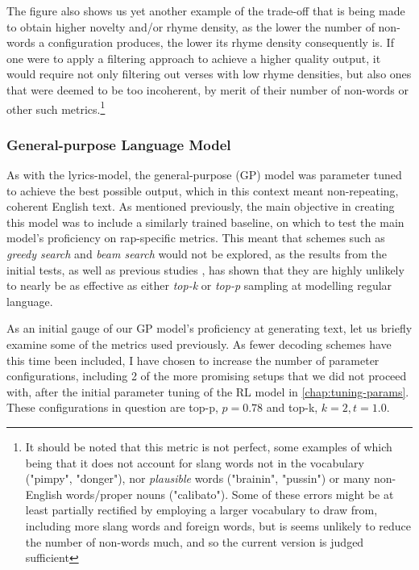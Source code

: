 The figure also shows us yet another example of the trade-off that is being made to obtain higher novelty and/or rhyme density, as the lower the number of non-words a configuration produces, the lower its rhyme density consequently is. If one were to apply a filtering approach to achieve a higher quality output, it would require not only filtering out verses with low rhyme densities, but also ones that were deemed to be too incoherent, by merit of their number of non-words or other such metrics.\footnote{It should be noted that this metric is not perfect, some examples of which being that it does not account for slang words not in the vocabulary ("pimpy", "donger"), nor \textit{plausible} words ("brainin", "pussin") or many non-English words/proper nouns ("calibato"). Some of these errors might be at least partially rectified by employing a larger vocabulary to draw from, including more slang words and foreign words, but is seems unlikely to reduce the number of non-words much, and so the current version is judged sufficient}

\subsubsection{General-purpose Language Model}
\label{sec:general-purpose-lm-results}

As with the lyrics-model, the general-purpose (GP) model was parameter tuned to achieve the best possible output, which in this context meant non-repeating, coherent English text. As mentioned previously, the main objective in creating this model was to include a similarly trained baseline, on which to test the main model's proficiency on rap-specific metrics. This meant that schemes such as \textit{greedy search} and \textit{beam search} would not be explored, as the results from the initial tests, as well as previous studies \cite{HoltzmanAri2019TCCo}, has shown that they are highly unlikely to nearly be as effective as either \textit{top-k} or \textit{top-p} sampling at modelling regular language.

As an initial gauge of our GP model's proficiency at generating text, let us briefly examine some of the metrics used previously. As fewer decoding schemes have this time been included, I have chosen to increase the number of parameter configurations, including 2 of the more promising setups that we did not proceed with, after the initial parameter tuning of the RL model in \cref{chap:tuning-params}. These configurations in question are top-p, $p=0.78$ and top-k, $k=2, t=1.0$.

